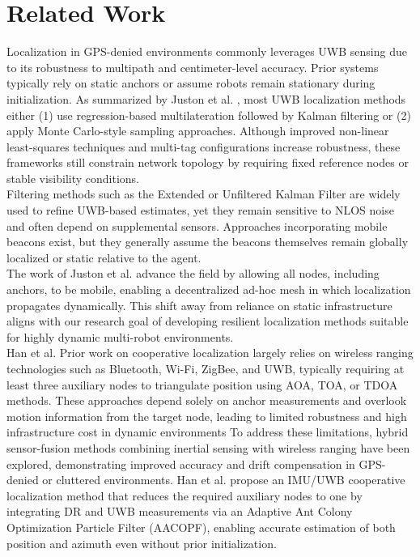 \section{Related Work}
\noindent Localization in GPS-denied environments commonly leverages UWB sensing due to its robustness to multipath and centimeter-level accuracy. Prior systems typically rely on static anchors or assume robots remain stationary during initialization. As summarized by Juston et al.
\cite{AdHocMeshNetworkLocalizationUsinUltra-WidebandForMobileRobotics}, most UWB localization methods either (1) use regression-based multilateration followed by Kalman filtering or (2) apply Monte Carlo-style sampling approaches. Although improved non-linear least-squares techniques and multi-tag configurations increase robustness, these frameworks still constrain network topology by requiring fixed reference nodes or stable visibility conditions.\\

\noindent Filtering methods such as the Extended or Unfiltered Kalman Filter are widely used to refine UWB-based estimates, yet they remain sensitive to NLOS noise and often depend on supplemental sensors. Approaches incorporating mobile beacons exist, but they generally assume the beacons themselves remain globally localized or static relative to the agent.\\

\noindent The work of Juston et al. \cite{AdHocMeshNetworkLocalizationUsinUltra-WidebandForMobileRobotics} advance the field by allowing all nodes, including anchors, to be mobile, enabling a decentralized ad-hoc mesh in which localization propagates dynamically. This shift away from reliance on static infrastructure aligns with our research goal of developing resilient localization methods suitable for highly dynamic multi-robot environments.\\

\noindent Han et al. \cite{ANovelCooperativeLocalizationMethodBasedonIMUandUWB} 
Prior work on cooperative localization largely relies on wireless ranging technologies such as Bluetooth, Wi-Fi, ZigBee, and UWB, typically requiring at least three auxiliary nodes to triangulate position using AOA, TOA, or TDOA methods. These approaches depend solely on anchor measurements and overlook motion information from the target node, leading to limited robustness and high infrastructure cost in dynamic environments 
To address these limitations, hybrid sensor-fusion methods combining inertial sensing with wireless ranging have been explored, demonstrating improved accuracy and drift compensation in GPS-denied or cluttered environments. Han et al. propose an IMU/UWB cooperative localization method that reduces the required auxiliary nodes to one by integrating DR and UWB measurements via an Adaptive Ant Colony Optimization Particle Filter (AACOPF), enabling accurate estimation of both position and azimuth even without prior initialization.\\ 


